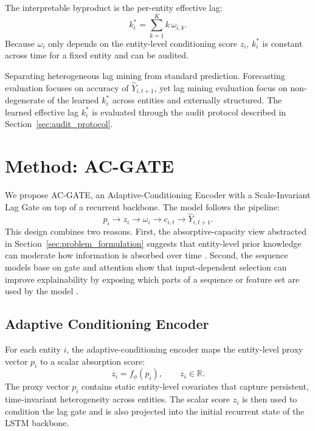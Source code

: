 \documentclass[conference]{IEEEtran}
\begin{document}
The interpretable byproduct is the per-entity effective lag:
\begin{equation}
    k_i^* = \sum_{k=1}^{K} k \, \omega_{i,k}.
\end{equation}
Because $\omega_i$ only depends on the entity-level conditioning score $z_i$, $k_i^*$ is constant across time for a fixed entity and can be audited. %

Separating heterogeneous lag mining from standard prediction. Forecasting evaluation focuses on accuracy of $\widehat{Y}_{i,t+1}$, yet lag mining evaluation focus on non-degenerate of the learned $k_i^*$ across entities and externally structured. The learned effective lag $k_i^*$ is evaluated through the audit protocol described in Section~\ref{sec:audit_protocol}.


\section{Method: AC-GATE}
We propose AC-GATE, an Adaptive-Conditioning Encoder with a Scale-Invariant Lag Gate on top of a recurrent backbone. The model follows the pipeline:
\[
    p_i \rightarrow z_i \rightarrow \omega_i \rightarrow c_{i,t} \rightarrow \widehat{Y}_{i,t+1}.
\]
This design combines two reasons. First, the absorptive-capacity view abstracted in Section~\ref{sec:problem_formulation} suggests that entity-level prior knowledge can moderate how information is absorbed over time \cite{cohen1990absorptive}. Second, the sequence models base on gate and attention show that input-dependent selection can improve explainability by exposing which parts of a sequence or feature set are used by the model \cite{xue2020gated,lim2021tft}.




\subsection{Adaptive Conditioning Encoder}
For each entity $i$, the adaptive-conditioning encoder maps the entity-level proxy vector $p_i$ to a scalar absorption score:
\begin{equation}
    z_i = f_{\phi}(p_i),
    \qquad z_i\in\mathbb{R}.
\end{equation}
The proxy vector $p_i$ contains static entity-level covariates that capture persistent, time-invariant heterogeneity across entities. The scalar score $z_i$ is then used to condition the lag gate and is also projected into the initial recurrent state of the LSTM backbone.
\end{document}
